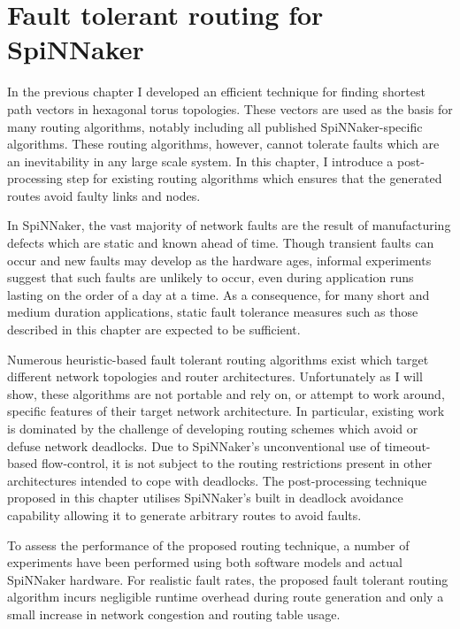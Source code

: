 \chapter{Fault tolerant routing for SpiNNaker}
	
	\label{sec:routing}
	
	In the previous chapter I developed an efficient technique for finding
	shortest path vectors in hexagonal torus topologies. These vectors are used
	as the basis for many routing algorithms, notably including all published
	SpiNNaker-specific algorithms. These routing algorithms, however, cannot
	tolerate faults which are an inevitability in any large scale system. In this
	chapter, I introduce a post-processing step for existing routing algorithms
	which ensures that the generated routes avoid faulty links and nodes.
	
	In SpiNNaker, the vast majority of network faults are the result of
	manufacturing defects which are static and known ahead of time. Though
	transient faults can occur and new faults may develop as the hardware ages,
	informal experiments suggest that such faults are unlikely to occur, even
	during application runs lasting on the order of a day at a time. As a
	consequence, for many short and medium duration applications, static fault
	tolerance measures such as those described in this chapter are expected to be
	sufficient.
	
	Numerous heuristic-based fault tolerant routing algorithms exist which target
	different network topologies and router architectures. Unfortunately as I
	will show, these algorithms are not portable and rely on, or attempt to work
	around, specific features of their target network architecture. In
	particular, existing work is dominated by the challenge of developing routing
	schemes which avoid or defuse network deadlocks. Due to SpiNNaker's
	unconventional use of timeout-based flow-control, it is not subject to the
	routing restrictions present in other architectures intended to cope with
	deadlocks. The post-processing technique proposed in this chapter utilises
	SpiNNaker's built in deadlock avoidance capability allowing it to generate
	arbitrary routes to avoid faults.
	
	To assess the performance of the proposed routing technique, a number of
	experiments have been performed using both software models and actual
	SpiNNaker hardware. For realistic fault rates, the proposed fault tolerant
	routing algorithm incurs negligible runtime overhead during route generation
	and only a small increase in network congestion and routing table usage.
	
